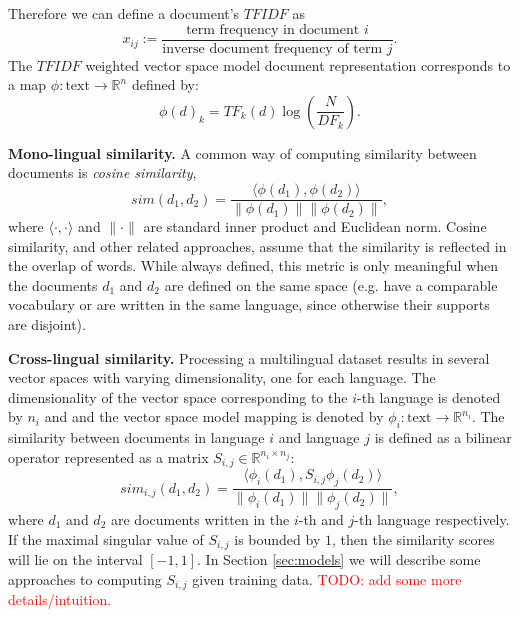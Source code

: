 \documentclass[twoside,11pt]{article}
\newcommand{\todo}[1]{\textcolor{red}{TODO: #1}}
\newcommand{\RR}{\mathbb{R}}
\begin{document}
Therefore we can define a document's $TFIDF$ as
$$ x_{ij}  := \frac{\mbox{term frequency in document } i}{\mbox{inverse document frequency of term } j}.$$
The $TFIDF$ weighted vector space model document representation corresponds to a map $\phi : \text{text} \rightarrow \RR^n$ defined by:
$$\phi(d)_k = {TF}_k(d) \log\left( \frac{N}{{DF}_k}\right).$$

\noindent\textbf {Mono-lingual similarity.}
A common way of computing similarity between documents is \emph{cosine similarity},
$$sim(d_1, d_2) = \frac{\langle \phi(d_1), \phi(d_2)\rangle}{\|\phi(d_1)\| \|\phi(d_2)\|},$$
where $\langle \cdot,\cdot \rangle$ and $\|\cdot\|$ are standard inner product and Euclidean norm. Cosine similarity, and other related approaches, assume that the similarity is reflected in the overlap of words. While always defined, this metric is only meaningful when the documents $d_1$ and $d_2$ are defined on the same space (e.g. have a comparable vocabulary or are written in the same language, since otherwise their supports are disjoint).

\noindent\textbf {Cross-lingual similarity.}
Processing a multilingual dataset results in several vector spaces with varying dimensionality, one for each language. The dimensionality of the vector space corresponding to the $i$-th language is denoted by $n_i$ and and the vector space model mapping is denoted by $\phi_i : \text{text} \rightarrow \RR^{n_i}$.
The similarity between documents in language $i$ and language $j$ is defined as a bilinear operator represented as a matrix $S_{i,j} \in \RR^{n_i \times n_j}$:
$$sim_{i,j}(d_1, d_2) = \frac{ \langle \phi_i (d_1), S_{i,j} \phi_j (d_2) \rangle }{\|\phi_i(d_1)\| \|\phi_j(d_2)\|},$$
where $d_1$ and $d_2$ are documents written in the $i$-th and $j$-th language respectively. If the maximal singular value of $S_{i,j}$ is bounded by $1$, then the similarity scores will lie on the interval $[-1, 1]$. In Section \ref{sec:models} we will describe some approaches to computing $S_{i,j}$ given training data. \todo{add some more details/intuition.}
\end{document}
